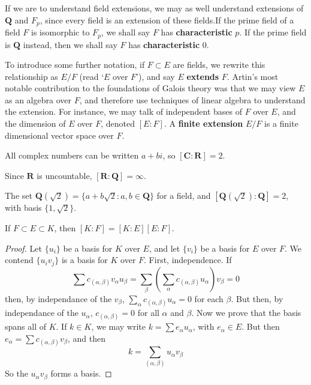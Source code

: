 If we are to understand field extensions, we may as well understand extensions of $\mathbf{Q}$ and $F_p$, since every field is an extension of these fields.If the prime field of a field $F$ is isomorphic to $F_p$, we shall say $F$ has {\bf characteristic} $p$. If the prime field is $\mathbf{Q}$ instead, then we shall say $F$ has {\bf characteristic} 0.

To introduce some further notation, if $F \subset E$ are fields, we rewrite this relationship as $E/F$ (read `$E$ over $F$'), and say $E$ {\bf extends} $F$. Artin's most notable contribution to the foundations of Galois theory was that we may view $E$ as an algebra over $F$, and therefore use techniques of linear algebra to understand the extension. For instance, we may talk of independent bases of $F$ over $E$, and the dimension of $E$ over $F$, denoted $[E: F]$. A {\bf finite extension} $E/F$ is a finite dimensional vector space over $F$.

\begin{example}
    All complex numbers can be written $a + bi$, so $[\mathbf{C}: \mathbf{R}] = 2$.
\end{example}

\begin{example}
    Since $\mathbf{R}$ is uncountable, $[\mathbf{R}: \mathbf{Q}] = \infty$. 
\end{example}

\begin{example}
    The set $\mathbf{Q}(\sqrt{2}) = \{ a + b \sqrt{2} : a,b \in \mathbf{Q} \}$ for a field, and $[\mathbf{Q}(\sqrt{2}): \mathbf{Q}] = 2$, with basis $\{ 1, \sqrt{2} \}$.
\end{example}

\begin{theorem}
    If $F \subset E \subset K$, then $[K:F] = [K: E][E: F]$.
\end{theorem}
\begin{proof}
    Let $\{ u_i \}$ be a basis for $K$ over $E$, and let $\{ v_i \}$ be a basis for $E$ over $F$. We contend $\{ u_i v_j \}$ is a basis for $K$ over $F$. First, independence. If
    \[ \sum c_{(\alpha,\beta)} v_\alpha u_\beta = \sum_\beta \left( \sum_\alpha c_{(\alpha, \beta)} u_\alpha \right) v_\beta = 0 \]
    then, by independance of the $v_\beta$, $\sum_\alpha c_{(\alpha, \beta)} u_\alpha = 0$ for each $\beta$. But then, by independance of the $u_\alpha$, $c_{(\alpha, \beta)} = 0$ for all $\alpha$ and $\beta$. Now we prove that the basis spans all of $K$. If $k \in K$, we may write $k = \sum e_\alpha u_\alpha$, with $e_\alpha \in E$. But then $e_\alpha = \sum c_{(\alpha, \beta)} v_\beta$, and then
    \[ k = \sum_{(\alpha, \beta)} u_\alpha v_\beta \]
    So the $u_\alpha v_\beta$ forms a basis.
\end{proof}

